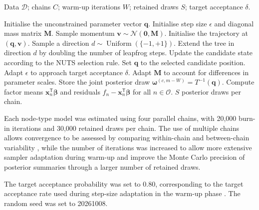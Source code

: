 \documentclass[pdftex,12pt,openright,a4paper,oneside]{book}
\begin{document}
\begin{algorithm}[H]
\caption{NUTS sampling for rank-one baseline model}
\label{alg:baseline_sampling}
\begin{algorithmic}[1]
\Require Data $\mathcal{D}$; chains $C$;
warm-up iterations $W$; retained draws $S$;
target acceptance $\delta$.

    \State Initialise the unconstrained parameter vector $\mathbf{q}$.
    \State Initialise step size $\epsilon$ and diagonal mass matrix $\mathbf{M}$.
        \State Sample momentum $\mathbf{v}\sim\mathcal{N}(\mathbf{0},\mathbf{M})$.
        \State  Initialise the trajectory at $(\mathbf{q},\mathbf{v})$.
        \Repeat
            \State Sample a direction $d\sim\operatorname{Uniform}(\{-1,+1\})$.
            \State Extend the tree in direction $d$ by doubling the number of leapfrog steps.
            \State Update the candidate state according to the NUTS selection rule.
        \State Set $\mathbf{q}$ to the selected candidate position.
            \State Adapt $\epsilon$ to approach target acceptance $\delta$.
            \State Adapt $\mathbf{M}$ to account for differences in parameter scales.
        \Else
            \State Store the joint posterior draw $\boldsymbol{\omega}^{(c,m-W)} =T^{-1}(\mathbf{q})$.
            \State Compute factor means $\mathbf{x}_{n}^{\mathsf T}\boldsymbol{\beta}$ and residuals
            $f_n-\mathbf{x}_{n}^{\mathsf T}\boldsymbol{\beta}$ for all $n\in\mathcal{O}$.
        \EndIf
    \EndFor
\EndFor
\State \Return $S$ posterior draws per chain.
\end{algorithmic}
\end{algorithm}

Each node-type model was estimated using four parallel chains, with 20,000 burn-in
iterations and 30,000 retained draws per chain.
The use of multiple chains allows convergence to be assessed
by comparing within-chain and between-chain variability
\citep{gelman2013bayesian}, while the number of iterations
was increased to allow more extensive sampler adaptation
during warm-up and improve the Monte Carlo precision of
posterior summaries through a larger number of retained draws.

The target acceptance probability was set to 0.80,
corresponding to the target acceptance rate used during
step-size adaptation in the warm-up phase
\citep{hoffman2014no}. The random seed was set to 20261008.
\end{document}
